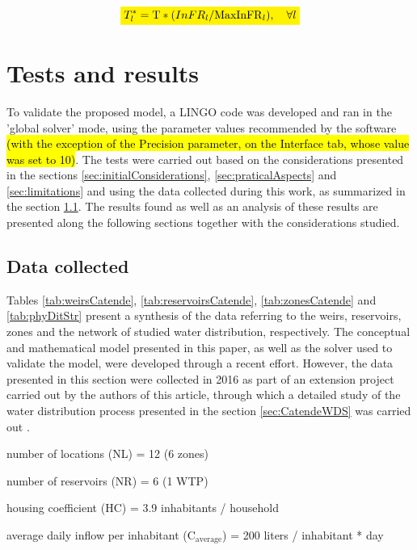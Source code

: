 \documentclass{singlecol}
\newcommand{\mathcolorbox}[2]{\colorbox{#1}{$\displaystyle #2$}}
\theoremstyle{TH}{
\newtheorem{lemma}{Lemma}
\newtheorem{theorem}[lemma]{Theorem}
\newtheorem{corrolary}[lemma]{Corrolary}
\newtheorem{conjecture}[lemma]{Conjecture}
\newtheorem{proposition}[lemma]{Proposition}
\newtheorem{claim}[lemma]{Claim}
\newtheorem{stheorem}[lemma]{Wrong Theorem}
\newtheorem{algorithm}{Algorithm}
}
\theoremstyle{THrm}{
\newtheorem{definition}{Definition}[section]
\newtheorem{question}{Question}[section]
\newtheorem{remark}{Remark}
\newtheorem{scheme}{Scheme}
}
\theoremstyle{THhit}{
\newtheorem{case}{Case}[section]
}
\begin{document}
\begin{equation}
	\mathcolorbox{yellow}{T^*_{l} = \mathrm{T} * ({InFR}_l / \mathrm{MaxInFR}_{l}), \quad \forall l}
	\label{eq:evalTimeAdq}
\end{equation}


\section{Tests and results}

To validate the proposed model, a LINGO code was developed and ran in the 'global solver' mode, using the parameter values recommended by the software \cite{LINGO} \hl{(with the exception of the Precision parameter, on the Interface tab, whose value was set to 10)}. The tests were carried out based on the considerations presented in the sections \ref{sec:initialConsiderations}, \ref{sec:praticalAspects} and \ref{sec:limitations} and using the data collected during this work, as summarized in the section \ref{sec:data}. The results found as well as an analysis of these results are presented along the following sections together with the considerations studied. 

\subsection{Data collected}
\label{sec:data}

Tables \ref{tab:weirsCatende}, \ref{tab:reservoirsCatende}, \ref{tab:zonesCatende} and \ref{tab:phyDitStr} present a synthesis of the data referring to the weirs, reservoirs, zones and the network of studied water distribution, respectively. The conceptual and mathematical model presented in this paper, as well as the solver used to validate the model, were developed through a recent effort. However, the data presented in this section were collected in 2016 as part of an extension project carried out by the authors of this article, through which a detailed study of the water distribution process presented in the section \ref{sec:CatendeWDS} was carried out \citep{CandidoEtAl2016}. 

\noindent number of locations (NL) = 12 (6 zones) 

\noindent number of reservoirs (NR) = 6 (1 WTP) 

\noindent housing coefficient ($\mathrm{HC}$) = 3.9 inhabitants / household 

\noindent average daily inflow per inhabitant ($\mathrm{C_{average}}$) = 200 liters / inhabitant * day 
\end{document}
